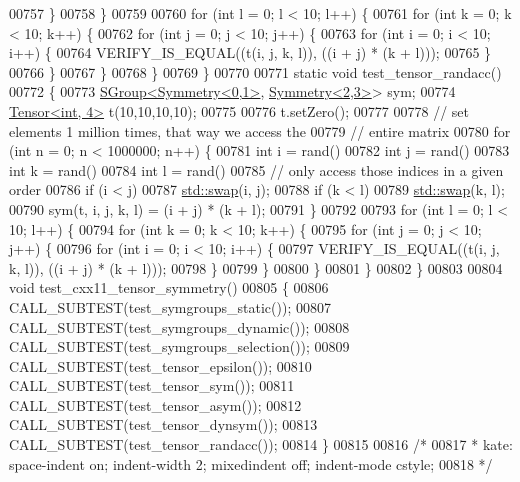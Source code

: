 \begin{DoxyCode}
00757     \}
00758   \}
00759 
00760   \textcolor{keywordflow}{for} (\textcolor{keywordtype}{int} l = 0; l < 10; l++) \{
00761     \textcolor{keywordflow}{for} (\textcolor{keywordtype}{int} k = 0; k < 10; k++) \{
00762       \textcolor{keywordflow}{for} (\textcolor{keywordtype}{int} j = 0; j < 10; j++) \{
00763         \textcolor{keywordflow}{for} (\textcolor{keywordtype}{int} i = 0; i < 10; i++) \{
00764           VERIFY\_IS\_EQUAL((t(i, j, k, l)), ((i + j) * (k + l)));
00765         \}
00766       \}
00767     \}
00768   \}
00769 \}
00770 
00771 \textcolor{keyword}{static} \textcolor{keywordtype}{void} test\_tensor\_randacc()
00772 \{
00773   \hyperlink{class_eigen_1_1_s_group}{SGroup<Symmetry<0,1>}, \hyperlink{struct_eigen_1_1_symmetry}{Symmetry<2,3>}> sym;
00774   \hyperlink{class_eigen_1_1_tensor}{Tensor<int, 4>} t(10,10,10,10);
00775 
00776   t.setZero();
00777 
00778   \textcolor{comment}{// set elements 1 million times, that way we access the}
00779   \textcolor{comment}{// entire matrix}
00780   \textcolor{keywordflow}{for} (\textcolor{keywordtype}{int} n = 0; n < 1000000; n++) \{
00781     \textcolor{keywordtype}{int} i = rand() %
00782     \textcolor{keywordtype}{int} j = rand() %
00783     \textcolor{keywordtype}{int} k = rand() %
00784     \textcolor{keywordtype}{int} l = rand() %
00785     \textcolor{comment}{// only access those indices in a given order}
00786     \textcolor{keywordflow}{if} (i < j)
00787       \hyperlink{endian_8c_a3ca5ecd34b04d6a243c054ac3a57f68d}{std::swap}(i, j);
00788     \textcolor{keywordflow}{if} (k < l)
00789       \hyperlink{endian_8c_a3ca5ecd34b04d6a243c054ac3a57f68d}{std::swap}(k, l);
00790     sym(t, i, j, k, l) = (i + j) * (k + l);
00791   \}
00792 
00793   \textcolor{keywordflow}{for} (\textcolor{keywordtype}{int} l = 0; l < 10; l++) \{
00794     \textcolor{keywordflow}{for} (\textcolor{keywordtype}{int} k = 0; k < 10; k++) \{
00795       \textcolor{keywordflow}{for} (\textcolor{keywordtype}{int} j = 0; j < 10; j++) \{
00796         \textcolor{keywordflow}{for} (\textcolor{keywordtype}{int} i = 0; i < 10; i++) \{
00797           VERIFY\_IS\_EQUAL((t(i, j, k, l)), ((i + j) * (k + l)));
00798         \}
00799       \}
00800     \}
00801   \}
00802 \}
00803 
00804 \textcolor{keywordtype}{void} test\_cxx11\_tensor\_symmetry()
00805 \{
00806   CALL\_SUBTEST(test\_symgroups\_static());
00807   CALL\_SUBTEST(test\_symgroups\_dynamic());
00808   CALL\_SUBTEST(test\_symgroups\_selection());
00809   CALL\_SUBTEST(test\_tensor\_epsilon());
00810   CALL\_SUBTEST(test\_tensor\_sym());
00811   CALL\_SUBTEST(test\_tensor\_asym());
00812   CALL\_SUBTEST(test\_tensor\_dynsym());
00813   CALL\_SUBTEST(test\_tensor\_randacc());
00814 \}
00815 
00816 \textcolor{comment}{/*}
00817 \textcolor{comment}{ * kate: space-indent on; indent-width 2; mixedindent off; indent-mode cstyle;}
00818 \textcolor{comment}{ */}
\end{DoxyCode}
